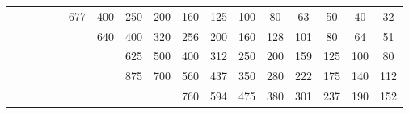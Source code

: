 \begin{xltabular}{\linewidth}{c CCCCCCCCCCCCCCCC}
			&			&			&			&			&	677	&	400	&	250	&	200	&	160	&	125	&	100	&	80		&	63		&	50		&	40		&	32 \\
			&			&			&			&			&			&	640	&	400	&	320	&	256	&	200	&	160	&	128	&	101	&	80		&	64		&	51 \\
			&			&			&			&			&			&			&	625	&	500	&	400	&	312	&	250	&	200	&	159	&	125	&	100	&	80 \\
			&			&			&			&			&			&			&	875	&	700	&	560	&	437	&	350	&	280	&	222	&	175	&	140	&	112 \\
			&			&			&			&			&			&			&			&			&	760	&	594	&	475	&	380	&	301	&	237	&	190	&	152 \\
\end{xltabular}



%

